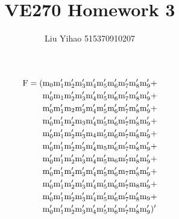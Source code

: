 \documentclass{article}
\title{VE270 Homework 3}
\author{Liu Yihao 515370910207}
\date{}
\begin{document}
\maketitle

\section{}

\begin{align*}
\rm F=(
&\rm m_0m_1'm_2'm_3'm_4'm_5'm_6'm_7'm_8'm_9'+\\
&\rm m_0'm_1m_2'm_3'm_4'm_5'm_6'm_7'm_8'm_9'+\\
&\rm m_0'm_1'm_2m_3'm_4'm_5'm_6'm_7'm_8'm_9'+\\
&\rm m_0'm_1'm_2'm_3m_4'm_5'm_6'm_7'm_8'm_9'+\\
&\rm m_0'm_1'm_2'm_3'm_4m_5'm_6'm_7'm_8'm_9'+\\
&\rm m_0'm_1'm_2'm_3'm_4'm_5m_6'm_7'm_8'm_9'+\\
&\rm m_0'm_1'm_2'm_3'm_4'm_5'm_6m_7'm_8'm_9'+\\
&\rm m_0'm_1'm_2'm_3'm_4'm_5'm_6'm_7m_8'm_9'+\\
&\rm m_0'm_1'm_2'm_3'm_4'm_5'm_6'm_7'm_8m_9'+\\
&\rm m_0'm_1'm_2'm_3'm_4'm_5'm_6'm_7'm_8'm_9+\\
&\rm m_0'm_1'm_2'm_3'm_4'm_5'm_6'm_7'm_8'm_9')'
\end{align*}
\end{document}
